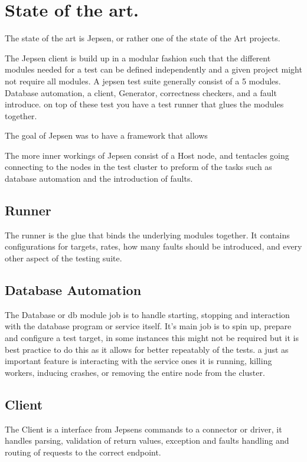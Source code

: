 \documentclass[a4paper,10pt,titlepage]{report}
\begin{document}
    \section{State of the art.}

    The state of the art is Jepsen, or rather one of the state of the Art projects.
    
    The Jepsen client is build up in a modular fashion such that the different modules needed for a test can be defined independently and a given project might not require all modules. A jepsen test suite generally consist of a 5 modules. Database automation, a client, Generator, correctness checkers, and a fault introduce. on top of these test you have a test runner that glues the modules together.
    
    The goal of Jepsen was to have a framework that allows 
    
    The more inner workings of Jepsen consist of a Host node, and tentacles going connecting to the nodes in the test cluster to preform of the tasks such as database automation and the introduction of faults.
    
    \subsection{Runner}
    
    The runner is the glue that binds the underlying modules together. It contains configurations for targets, rates, how many faults should be introduced, and every other aspect of the testing suite.
    
    \subsection{Database Automation}
     The Database or db module job is to handle starting, stopping and interaction with the database program or service itself. It's main job is to spin up, prepare and configure a test target, in some instances this might not be required but it is best practice to do this as it allows for better repeatably of the tests. a just as important feature is interacting with the service ones it is running, killing workers, inducing crashes, or removing the entire node from the cluster.
    
    \subsection{Client}
    The Client is a interface from Jepsens commands to a connector or driver, it handles parsing, validation of return values, exception and faults handling and routing of requests to the correct endpoint.
    
\end{document}

